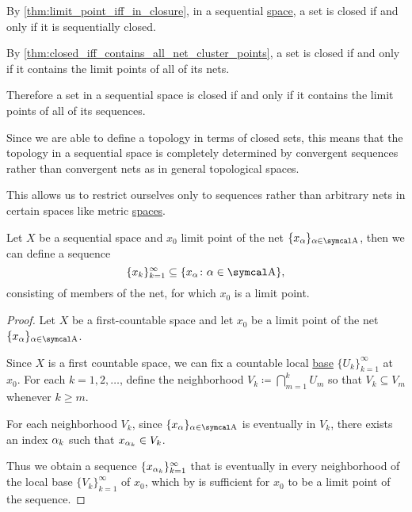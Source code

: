 \begin{remark}\label{remark:sequential_spaces}
  By \cref{thm:limit_point_iff_in_closure}, in a sequential \hyperref[def:sequential_space]{space}, a set is closed if and only if it is sequentially closed.

  By \cref{thm:closed_iff_contains_all_net_cluster_points}, a set is closed if and only if it contains the limit points of all of its nets.

  Therefore a set in a sequential space is closed if and only if it contains the limit points of all of its sequences.

  Since we are able to define a topology in terms of closed sets, this means that the topology in a sequential space is completely determined by convergent sequences rather than convergent nets as in general topological spaces.

  This allows us to restrict ourselves only to sequences rather than arbitrary nets in certain spaces like metric \hyperref[def:metric_space]{spaces}.
\end{remark}

\begin{lemma}\label{thm:sequential_space_convergence}
  Let \( X \) be a sequential space and \( x_0 \) limit point of the net \( \{ x_\al \}_{\al \in \CA} \), then we can define a sequence
  \begin{equation*}
    \{ x_k \}_{k=1}^\infty \subseteq \{ x_\al \colon \al \in \CA \},
  \end{equation*}
  consisting of members of the net, for which \( x_0 \) is a limit point.
\end{lemma}
\begin{proof}
  Let \( X \) be a first-countable space and let \( x_0 \) be a limit point of the net \( \{ x_\al \}_{\al \in \CA} \).

  Since \( X \) is a first countable space, we can fix a countable local \hyperref[def:topological_local_base]{base} \( \{ U_k \}_{k=1}^\infty \) at \( x_0 \). For each \( k = 1, 2, \ldots \), define the neighborhood \( V_k \coloneqq \bigcap_{m=1}^k U_m \) so that \( V_k \subseteq V_m \) whenever \( k \geq m \).

  For each neighborhood \( V_k \), since \( \{ x_\al \}_{\al \in \CA} \) is eventually in \( V_k \), there exists an index \( \alpha_k \) such that \( x_{\alpha_k} \in V_k \).

  Thus we obtain a sequence \( \{ x_{\alpha_k} \}_{k=1}^\infty \) that is eventually in every neighborhood of the local base \( \{ V_k \}_{k=1}^\infty \) of \( x_0 \), which by  is sufficient for \( x_0 \) to be a limit point of the sequence.
\end{proof}

